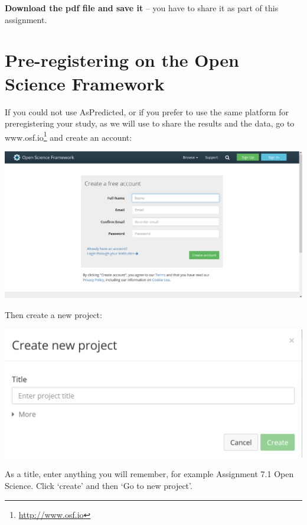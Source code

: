 \documentclass[
  oneside]{krantz}
\renewcommand{\href}[2]{#2\footnote{\url{#1}}}
\begin{document}
\textbf{Download the pdf file and save it} -- you have to share it as part of this
assignment.

\hypertarget{pre-registering-on-the-open-science-framework}{%
\section{Pre-registering on the Open Science Framework}\label{pre-registering-on-the-open-science-framework}}

If you could not use AsPredicted, or if you prefer to use the same platform for preregistering your study, as we will use to share the results and the data, go to \href{http://www.osf.io}{www.osf.io} and create an account:

\begin{center}\includegraphics[width=1\linewidth]{images/7d6b26f83fee88df8bd46f30f4441844} \end{center}

Then create a new project:

\begin{center}\includegraphics[width=1\linewidth]{images/2319f53e025e2b9c707f1062f478dc1a} \end{center}

As a title, enter anything you will remember, for example Assignment 7.1 Open
Science. Click `create' and then `Go to new project'.
\end{document}
